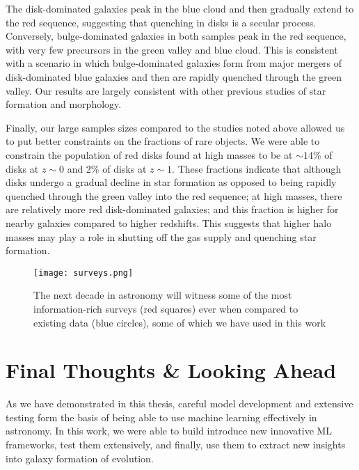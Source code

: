 The disk-dominated galaxies peak in the blue cloud and then gradually extend to the red sequence, suggesting that quenching in disks is a secular process. Conversely, bulge-dominated galaxies in both samples peak  in  the  red  sequence,  with  very few precursors in the green valley and blue cloud. This is consistent with a scenario in which bulge-dominated galaxies form from major mergers of disk-dominated blue galaxies and then are rapidly quenched through the green valley. Our results are largely consistent with other previous studies of star formation and morphology.

Finally, our large samples sizes compared to the studies noted above allowed us to put better constraints on the fractions of rare objects. We were able to constrain the population of red disks found at high masses to be at $\sim14$\% of disks at $z\sim0$ and 2\% of disks at $z \sim 1$. These fractions indicate that although disks undergo a gradual decline in star formation as opposed to being rapidly quenched through the green valley into the red sequence; at high masses, there are relatively more red disk-dominated galaxies; and this fraction is higher for nearby galaxies compared to higher redshifts. This suggests that higher halo masses may play a role in shutting off the gas supply and quenching star formation. 

\begin{wrapfigure}{R}{0.45\textwidth}
\centering
\vspace{-0.3in}
\texttt{[image: surveys.png]}
\vspace{-0.3in}
\caption{ The next decade in astronomy will witness some of the most information-rich surveys (red squares) ever when compared to existing data (blue circles), some of which we have used in this work }
\label{fig:surveys}
\vspace{-0.2in}
\end{wrapfigure}


\section{Final Thoughts \& Looking Ahead} \label{sec_conc:future}
As we have demonstrated in this thesis, careful model development and extensive testing form the basis of being able to use machine learning effectively in astronomy. In this work, we were able to build introduce new innovative ML frameworks, test them extensively, and finally, use them to extract new insights into galaxy formation of evolution.


